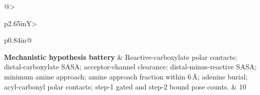 \documentclass[11pt]{article}
\begin{document}
\begin{tabularx}{\textwidth}{@{}>{\raggedright\arraybackslash{}}p{2.65in}Y>{\raggedright\arraybackslash}p{0.84in}@{}}
\textbf{Mechanistic hypothesis battery} & Reactive-carboxylate polar contacts; distal-carboxylate SASA; acceptor-channel clearance; distal-minus-reactive SASA; minimum amine approach; amine approach fraction within 6\,\AA; adenine burial; acyl-carbonyl polar contacts; step-1 gated and step-2 bound pose counts. & 10 \\

\end{tabularx}
\end{document}

